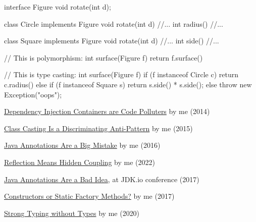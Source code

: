 \documentclass{article}
\begin{document}

\begin{pptWide}{2}
{\small\begin{ffcode}
interface Figure
  void rotate(int d);

class Circle implements Figure
  void rotate(int d) //...
  int radius() //...

class Square implements Figure
  void rotate(int d) //...
  int side() //...
\end{ffcode}
}
\par\columnbreak\par
{\small\begin{ffcode}
// This is polymorphism:
int surface(Figure f)
  return f.surface()

// This is type casting:
int surface(Figure f)
  if (f instanceof Circle c) {
    return c.radius()
  } else if (f instanceof Square s) {
    return s.side() * s.side();
  } else {
    throw new Exception("oops");
  }
\end{ffcode}
}
\end{pptWide}
\par
\plush{}


\href{https://www.yegor256.com/2014/10/03/di-containers-are-evil.html}{Dependency Injection Containers are Code Polluters} by me (2014)

\href{https://www.yegor256.com/2015/04/02/class-casting-is-anti-pattern.html}{Class Casting Is a Discriminating Anti-Pattern} by me (2015)

\href{https://www.yegor256.com/2016/04/12/java-annotations-are-evil.html}{Java Annotations Are a Big Mistake} by me (2016)

\href{https://www.yegor256.com/2022/06/05/reflection-means-hidden-coupling.html}{Reflection Means Hidden Coupling} by me (2022)

\href{https://www.youtube.com/watch?v=cv23Z6xpwDw}{Java Annotations Are a Bad Idea}, at JDK.io conference (2017)

\href{https://www.yegor256.com/2017/11/14/static-factory-methods.html}{Constructors or Static Factory Methods?} by me (2017)

\href{https://www.yegor256.com/2020/11/10/typing-without-types.html}{Strong Typing without Types} by me (2020)
\end{document}
